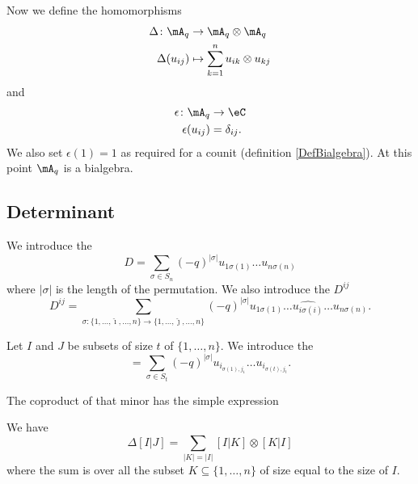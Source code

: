 Now we define the homomorphisms
\begin{equation}
    \begin{aligned}
        \Delta\colon \mA_q&\to \mA_q\otimes\mA_q \\
        \Delta(u_{ij})&\mapsto \sum_{k=1}^nu_{ik}\otimes u_{kj}
    \end{aligned}
\end{equation}
and
\begin{equation}
    \begin{aligned}
        \epsilon\colon \mA_q&\to \eC \\
        \epsilon(u_{ij})&=\delta_{ij}. 
    \end{aligned}
\end{equation}
We also set \( \epsilon(1)=1\) as required for a counit (definition \ref{DefBialgebra}). At this point $\mA_q$ is a bialgebra.


\subsection{Determinant}

We introduce the 
\begin{equation}
    D=\sum_{\sigma\in S_n}(-q)^{| \sigma |}u_{1\sigma(1)}\ldots u_{n\sigma(n)}
\end{equation}
where $| \sigma |$ is the length of the permutation. We also introduce the  $D^{ij}$
\begin{equation}        \label{Eqdefdijmineurquan}
    D^{ij}=\sum_{\sigma\colon \{ 1,\ldots,\hat\imath,\ldots,n \}\to \{ 1,\ldots,\hat\jmath,\ldots,n \}}(-q)^{| \sigma |}u_{1\sigma(1)}\ldots\widehat{u_{i\sigma(i)}}\ldots u_{n\sigma(n)}.
\end{equation}

Let $I$ and $J$ be subsets of size $t$ of $\{ 1,\ldots,n \}$. We introduce the 
\begin{equation}
    [I|J]=\sum_{\sigma\in S_t}(-q)^{| \sigma |} u_{i_{\sigma(1),j_1}}\ldots u_{i_{\sigma(t),j_t}}.
\end{equation}

The coproduct of that minor has the simple expression\cite{Goodearl}
\begin{proposition}     \label{LemMineurQuantique}
    We have
    \begin{equation}
        \Delta[I|J]=\sum_{| K |=| I |}[I|K]\otimes[K|I]
    \end{equation}
    where the sum is over all the subset $K\subseteq\{ 1,\ldots,n \}$ of size equal to the size of $I$.
\end{proposition}


